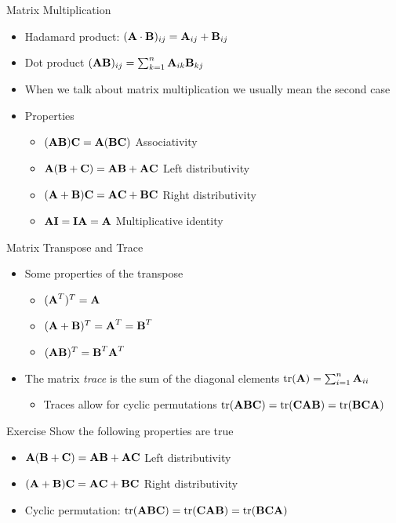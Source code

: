 \documentclass{beamer}
\begin{document}
\begin{frame}{Matrix Multiplication} 
\begin{itemize} 
 \item Hadamard product: $(\textbf{A} \cdot \textbf{B})_{ij} = \textbf{A}_{ij} + \textbf{B}_{ij}$ 
 \item Dot product $(\textbf{A}\textbf{B})_{ij} = \sum_{k=1}^n \textbf{A}_{ik}\textbf{B}_{kj}$
 \item When we talk about matrix multiplication we usually mean the second case 
 \item Properties 
 \begin{itemize}
 \item $(\textbf{A}\textbf{B})\textbf{C} = \textbf{A}(\textbf{B}\textbf{C})$ Associativity 
 \item $\textbf{A}(\textbf{B} + \textbf{C}) = \textbf{A}\textbf{B} + \textbf{A}\textbf{C}$ Left distributivity 
 \item $(\textbf{A} +\textbf{B}) \textbf{C} = \textbf{A}\textbf{C} +\textbf{B}\textbf{C}$ Right distributivity 
 \item $\textbf{A}\textbf{I} = \textbf{I}\textbf{A} = \textbf{A}$ Multiplicative identity 
 \end{itemize} 
\end{itemize}
\end{frame}

\begin{frame}{Matrix Transpose and Trace} 
 \begin{itemize} 
  \item Some properties of the transpose  
  \begin{itemize}
  \item $(\textbf{A}^T)^T = \textbf{A}$ 
  \item $(\textbf{A} + \textbf{B})^T = \textbf{A}^T = \textbf{B}^T$ 
  \item $(\textbf{A}\textbf{B})^T = \textbf{B}^T\textbf{A}^T$  
  \end{itemize} 
 \item The matrix \emph{trace} is the sum of the diagonal elements $\mbox{tr}(\textbf{A}) = \sum_{i=1}^n \textbf{A}_{ii}$ 
 \begin{itemize} 
 \item Traces allow for cyclic permutations $\mbox{tr}(\textbf{A}\textbf{B}\textbf{C}) = \mbox{tr}(\textbf{C}\textbf{A}\textbf{B}) = \mbox{tr}(\textbf{B}\textbf{C}\textbf{A})$ 
 \end{itemize}
 \end{itemize}
\end{frame}

\begin{frame}{Exercise} 
Show the following properties are true
\begin{itemize}
 \item $\textbf{A}(\textbf{B} + \textbf{C}) = \textbf{A}\textbf{B} + \textbf{A}\textbf{C}$ Left distributivity 
 \item $(\textbf{A} +\textbf{B}) \textbf{C} = \textbf{A}\textbf{C} +\textbf{B}\textbf{C}$ Right distributivity 
 \item Cyclic permutation: $\mbox{tr}(\textbf{A}\textbf{B}\textbf{C}) = \mbox{tr}(\textbf{C}\textbf{A}\textbf{B}) = \mbox{tr}(\textbf{B}\textbf{C}\textbf{A})$ 
\end{itemize}
\end{frame}
\end{document}
